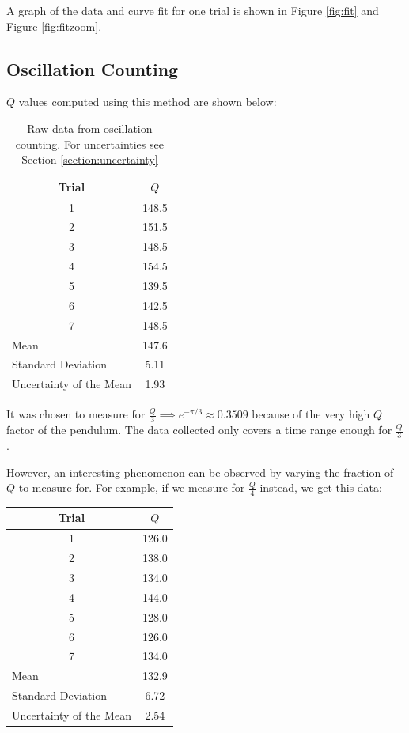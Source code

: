 \documentclass[aps,twocolumn,secnumarabic,nobalancelastpage,amsmath,amssymb,nofootinbib]{revtex4}
\begin{document}
A graph of the data and curve fit for one trial is shown in Figure \ref{fig:fit} and Figure \ref{fig:fitzoom}.

\subsection{Oscillation Counting}

\(Q\) values computed using this method are shown below:
\begin{table}[h]
    \begin{tabular}{cc}
        Trial & \(Q\)\\
        \hline
        1   & 148.5 \\
        2   & 151.5 \\
        3	& 148.5 \\
        4	& 154.5 \\
        5	& 139.5 \\
        6	& 142.5 \\
        7	& 148.5 \\
        \hline
        \multicolumn{1}{l}{Mean} & 147.6 \\
        \multicolumn{1}{l}{Standard Deviation} & 5.11 \\
        \multicolumn{1}{l}{Uncertainty of the Mean} & 1.93
    \end{tabular}
    \caption{Raw data from oscillation counting. For uncertainties see Section \ref{section:uncertainty}}
\end{table}

It was chosen to measure for \(\frac{Q}{3} \implies e^{-\pi/3} \approx 0.3509\) because of the very high \(Q\) factor of
the pendulum. The data collected only covers a time range enough for \(\frac{Q}{3}\).

However, an interesting phenomenon can be observed by varying the fraction of \(Q\) to measure for.
For example, if we measure for \(\frac{Q}{4}\) instead, we get this data:
\begin{table}[h]
    \begin{tabular}{cc}
        Trial & \(Q\)\\
        \hline
        1   & 126.0 \\
        2   & 138.0 \\
        3	& 134.0 \\
        4	& 144.0 \\
        5	& 128.0 \\
        6	& 126.0 \\
        7	& 134.0 \\
        \hline
        \multicolumn{1}{l}{Mean} & 132.9 \\
        \multicolumn{1}{l}{Standard Deviation} & 6.72 \\
        \multicolumn{1}{l}{Uncertainty of the Mean} & 2.54
    \end{tabular}
\end{table}
\end{document}
